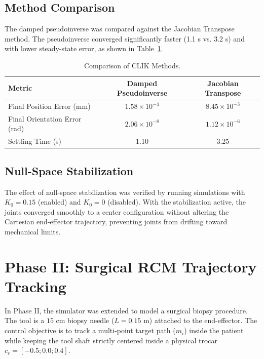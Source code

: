 \documentclass[11pt,a4paper]{article}
\begin{document}
\subsection{Method Comparison}
The damped pseudoinverse was compared against the Jacobian Transpose method. The pseudoinverse converged significantly faster (1.1 s vs. 3.2 s) and with lower steady-state error, as shown in Table~\ref{tab:clik_comparison}.

\begin{table}[H]
\centering
\caption{Comparison of CLIK Methods.}
\label{tab:clik_comparison}
\begin{tabular}{@{}lcc@{}}
\toprule
Metric & Damped Pseudoinverse & Jacobian Transpose \\ \midrule
Final Position Error (mm) & $1.58 \times 10^{-4}$ & $8.45 \times 10^{-3}$ \\
Final Orientation Error (rad) & $2.06 \times 10^{-8}$ & $1.12 \times 10^{-6}$ \\
Settling Time (s) & 1.10 & 3.25 \\ \bottomrule
\end{tabular}
\end{table}

\subsection{Null-Space Stabilization}
The effect of null-space stabilization was verified by running simulations with $K_0 = 0.15$ (enabled) and $K_0 = 0$ (disabled). With the stabilization active, the joints converged smoothly to a center configuration without altering the Cartesian end-effector trajectory, preventing joints from drifting toward mechanical limits.

\section{Phase II: Surgical RCM Trajectory Tracking}
In Phase II, the simulator was extended to model a surgical biopsy procedure. The tool is a $15\text{ cm}$ biopsy needle ($L = 0.15\text{ m}$) attached to the end-effector. The control objective is to track a multi-point target path ($m_i$) inside the patient while keeping the tool shaft strictly centered inside a physical trocar $c_r = [-0.5; 0.0; 0.4]$.
\end{document}
